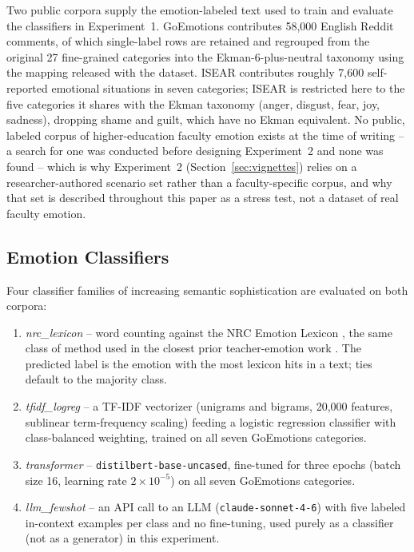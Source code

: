 \documentclass[higheredu,article,submit,pdftex,moreauthors]{Definitions/mdpi}
\begin{document}
Two public corpora supply the emotion-labeled text used to train and evaluate the classifiers in Experiment~1. GoEmotions \cite{demszky2020} contributes 58{,}000 English Reddit comments, of which single-label rows are retained and regrouped from the original 27 fine-grained categories into the Ekman-6-plus-neutral taxonomy using the mapping released with the dataset. ISEAR \cite{scherer1994} contributes roughly 7{,}600 self-reported emotional situations in seven categories; ISEAR is restricted here to the five categories it shares with the Ekman taxonomy (anger, disgust, fear, joy, sadness), dropping shame and guilt, which have no Ekman equivalent. No public, labeled corpus of higher-education faculty emotion exists at the time of writing -- a search for one was conducted before designing Experiment~2 and none was found -- which is why Experiment~2 (Section~\ref{sec:vignettes}) relies on a researcher-authored scenario set rather than a faculty-specific corpus, and why that set is described throughout this paper as a stress test, not a dataset of real faculty emotion.

\subsection{Emotion Classifiers}
\label{sec:classifiers}

Four classifier families of increasing semantic sophistication are evaluated on both corpora:
\begin{enumerate}
\item \textit{nrc\_lexicon} -- word counting against the NRC Emotion Lexicon \cite{mohammad2013}, the same class of method used in the closest prior teacher-emotion work \cite{chen2020}. The predicted label is the emotion with the most lexicon hits in a text; ties default to the majority class.
\item \textit{tfidf\_logreg} -- a TF-IDF vectorizer (unigrams and bigrams, 20{,}000 features, sublinear term-frequency scaling) feeding a logistic regression classifier with class-balanced weighting, trained on all seven GoEmotions categories.
\item \textit{transformer} -- \texttt{distilbert-base-uncased}, fine-tuned for three epochs (batch size 16, learning rate $2\times10^{-5}$) on all seven GoEmotions categories.
\item \textit{llm\_fewshot} -- an API call to an LLM (\texttt{claude-sonnet-4-6}) with five labeled in-context examples per class and no fine-tuning, used purely as a classifier (not as a generator) in this experiment.
\end{enumerate}
\end{document}

